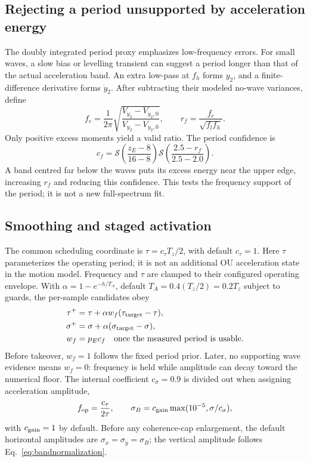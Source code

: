 \documentclass[conference]{IEEEtran}
\begin{document}
\subsection{Rejecting a period unsupported by acceleration energy}
The doubly integrated period proxy emphasizes low-frequency errors.
For small waves, a slow bias or levelling transient can suggest a period
longer than that of the actual acceleration band. An extra low-pass at
$f_h$ forms $y_2$, and a finite-difference derivative forms $\dot y_2$.
After subtracting their modeled no-wave variances, define
\begin{equation}
 f_c=\frac1{2\pi}\sqrt{\frac{V_{\dot y_2}-V_{\dot y_2,0}}
                                  {V_{y_2}-V_{y_2,0}}},\qquad
 r_f=\frac{f_c}{\sqrt{f_lf_h}}.
 \label{eq:fc}
\end{equation}
Only positive excess moments yield a valid ratio. The period confidence is
\begin{equation}
 c_f=\mathcal S\!\left(\frac{z_E-8}{16-8}\right)
         \mathcal S\!\left(\frac{2.5-r_f}{2.5-2.0}\right).
 \label{eq:cf}
\end{equation}
A band centred far below the waves puts its excess energy near the upper
edge, increasing $r_f$ and reducing this confidence. This tests the
frequency support of the period; it is not a new full-spectrum fit.

\subsection{Smoothing and staged activation}
The common scheduling coordinate is $\tau=c_\tau T_z/2$, with default
$c_\tau=1$. Here $\tau$ parameterizes the operating period; it is not an
additional OU acceleration state in the motion model. Frequency and
$\tau$ are clamped to their configured operating envelope. With
$\alpha=1-e^{-h/T_A}$, default $T_A=0.4(T_z/2)=0.2T_z$ subject to guards,
the per-sample candidates obey
\begin{align}
 \tau^+&=\tau+\alpha w_f(\tau_{\rm target}-\tau),\nonumber\\
 \sigma^+&=\sigma+\alpha(\sigma_{\rm target}-\sigma),\label{eq:ema}\\
 w_f&=p_Ec_f\quad\text{once the measured period is usable}.\nonumber
\end{align}
Before takeover, $w_f=1$ follows the fixed period prior. Later, no
supporting wave evidence means $w_f=0$: frequency is held while amplitude
can decay toward the numerical floor. The internal coefficient
$c_\sigma=0.9$ is divided out when assigning acceleration amplitude,
\begin{equation}
 f_{\rm op}=\frac{c_\tau}{2\tau},\qquad
 \sigma_B=c_{\rm gain}\max(10^{-5},\sigma/c_\sigma),
 \label{eq:operatingpoint}
\end{equation}
with $c_{\rm gain}=1$ by default. Before any coherence-cap enlargement,
the default horizontal amplitudes are $\sigma_x=\sigma_y=\sigma_B$;
the vertical amplitude follows Eq.~\eqref{eq:bandnormalization}.
\end{document}
